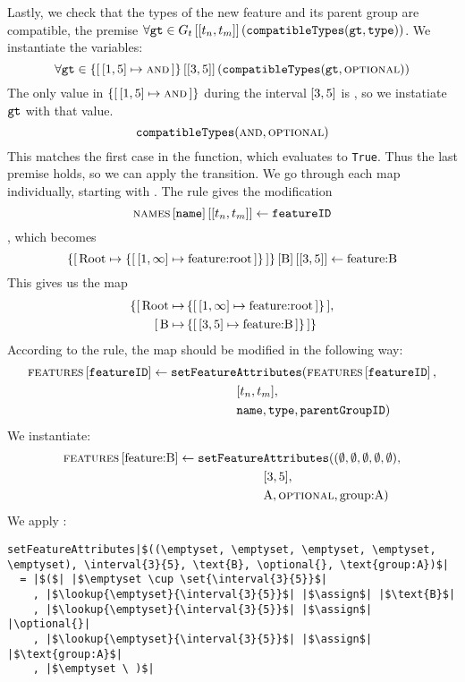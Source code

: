 Lastly, we check that the types of the new feature and its parent group are compatible, the premise $\forall \var{gt} \in \lookup{G_t}{\interval{t_n}{t_m}} (\var{compatibleTypes}(\var{gt}, \var{type}))$. We instantiate the variables:
\[
  \forall \var{gt} \in \lookup{\set{\intervalmapping{1}{5}{\andtype}}}{\interval{3}{5}}(\var{compatibleTypes}(\var{gt}, \optional{}))
\]
The only value in $\set{\intervalmapping{1}{5}{\andtype}}$ during the interval $\interval{3}{5}$ is \andtype, so we instatiate $\texttt{gt}$ with that value.
\[
  \texttt{compatibleTypes}(\textsc{and}{}, \textsc{optional}{})
\]
This matches the first case in the  function, which evaluates to \texttt{True}. Thus the last premise holds, so we can apply the transition. We go through each map individually, starting with \names{}. The rule gives the modification
\[
  \lookup{\lookup{\names{}}{\var{name}}}{\interval{t_n}{t_m}} \assign \var{featureID}
\]
, which becomes
\[
  \lookup{\lookup{\{  \mapping{\text{Root}}{\set{\intervalmapping{1}{\forever}{\text{feature:root}}}}\}}{\text{B}}}{\interval{3}{5}} \assign \text{feature:B}
\]
This gives us the map
\begin{align*}
  \{\mapping{\text{Root}}{& \set{\intervalmapping{1}{\forever}{\text{feature:root}}}}, \\
   \mapping{\text{B}}{& \set{\intervalmapping{3}{5}{\text{feature:B}}}}\} 
\end{align*}
According to the rule, the \features{} map should be modified in the following way:
\begin{align*}
  \lookup{\features{}}{\var{featureID}} \assign \var{setFeature}&\var{Attributes}(\lookup{\features{}}{\var{featureID}}, \\
                           &\interval{t_n}{t_m},\\
                           &\var{name}, \var{type}, \var{parentGroupID})
\end{align*}
We instantiate:
\begin{align*}
  \lookup{\features{}}{\text{feature:B}} \assign \var{setFeature}&\var{Attributes}((\emptyset, \emptyset, \emptyset, \emptyset, \emptyset), \\
                           &\interval{3}{5},\\
                           &\text{A}, \optional{}, \text{group:A})
\end{align*}
We apply :
\begin{verbatim}
setFeatureAttributes|$((\emptyset, \emptyset, \emptyset, \emptyset, \emptyset), \interval{3}{5}, \text{B}, \optional{}, \text{group:A})$|
  = |$($| |$\emptyset \cup \set{\interval{3}{5}}$|
    , |$\lookup{\emptyset}{\interval{3}{5}}$| |$\assign$| |$\text{B}$|
    , |$\lookup{\emptyset}{\interval{3}{5}}$| |$\assign$| |\optional{}|
    , |$\lookup{\emptyset}{\interval{3}{5}}$| |$\assign$| |$\text{group:A}$|
    , |$\emptyset \ )$|
 \end{verbatim}
